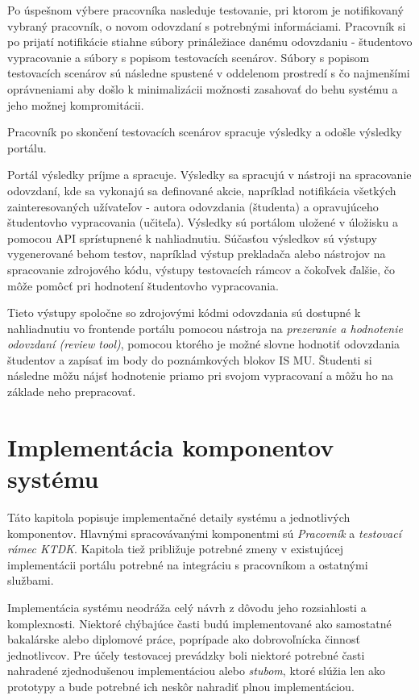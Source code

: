 \documentclass[
  digital, %
  twoside, %
  table,   %
  lof,     %
  lot,     %
]{fithesis3}
\begin{document}
Po úspešnom výbere pracovníka nasleduje testovanie, pri ktorom je notifikovaný vybraný pracovník, o novom odovzdaní s potrebnými informáciami. Pracovník si po prijatí notifikácie stiahne súbory prináležiace danému odovzdaniu - študentovo vypracovanie a súbory s popisom testovacích scenárov. Súbory s popisom testovacích scenárov sú následne spustené v oddelenom prostredí s čo najmenšími oprávneniami aby došlo k minimalizácii možnosti zasahovať do behu systému a jeho možnej kompromitácii.

Pracovník po skončení testovacích scenárov spracuje výsledky a odošle výsledky portálu.

Portál výsledky príjme a spracuje. Výsledky sa spracujú v nástroji na spracovanie odovzdaní, kde sa vykonajú sa definované akcie, napríklad notifikácia všetkých zainteresovaných užívateľov - autora odovzdania (študenta) a opravujúceho študentovho vypracovania (učiteľa). Výsledky sú portálom uložené v úložisku a pomocou API sprístupnené k nahliadnutiu. Súčasťou výsledkov sú výstupy vygenerované behom testov, napríklad výstup prekladača alebo nástrojov na spracovanie zdrojového kódu, výstupy testovacích rámcov a čokoľvek ďalšie, čo môže pomôcť pri hodnotení študentovho vypracovania.

Tieto výstupy spoločne so zdrojovými kódmi odovzdania sú dostupné k nahliadnutiu vo frontende portálu pomocou nástroja na \emph{prezeranie a hodnotenie odovzdaní (review tool)}, pomocou ktorého je možné slovne hodnotiť odovzdania študentov a zapísať im body do poznámkových blokov IS MU. Študenti si následne môžu nájsť hodnotenie priamo pri svojom vypracovaní a môžu ho na základe neho prepracovať. 

\chapter{Implementácia komponentov systému}

Táto kapitola popisuje implementačné detaily systému a jednotlivých komponentov. Hlavnými spracovávanými komponentmi sú \emph{Pracovník} a \emph{testovací rámec KTDK}. Kapitola tiež približuje potrebné zmeny v existujúcej implementácii portálu potrebné na integráciu s pracovníkom a ostatnými službami.

Implementácia systému neodráža celý návrh z dôvodu jeho rozsiahlosti a komplexnosti. Niektoré chýbajúce časti budú implementované ako samostatné bakalárske alebo diplomové práce, poprípade ako dobrovoľnícka činnosť jednotlivcov. Pre účely testovacej prevádzky boli niektoré potrebné časti nahradené zjednodušenou implementáciou alebo \emph{stubom}, ktoré slúžia len ako prototypy a bude potrebné ich neskôr nahradiť plnou implementáciou.
\end{document}
